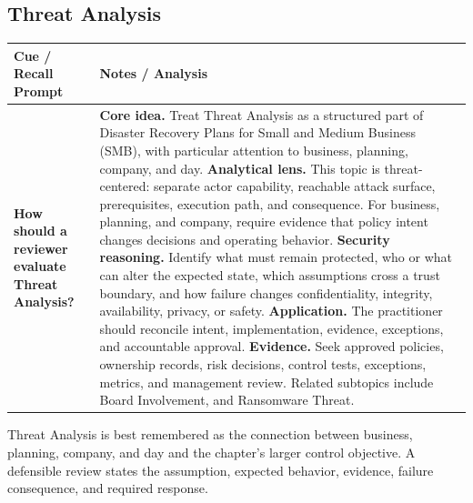 \documentclass[11pt]{article}
\newcommand{\CornellHeader}{%
\rowcolor{Navy}\color{white}\bfseries Cue / Recall Prompt & \color{white}\bfseries Notes / Analysis\\\hline}
\newcommand{\CornellRow}[2]{%
\cellcolor{CueGray}\RaggedRight\textbf{#1} & \RaggedRight #2\\\hline}
\begin{document}
\subsection*{Threat Analysis}
\begin{longtable}{>{\RaggedRight\arraybackslash}p{}|>{\RaggedRight\arraybackslash}p{}}
\CornellHeader
\CornellRow{How should a reviewer evaluate Threat Analysis?}{\textbf{Core idea.} Treat Threat Analysis as a structured part of Disaster Recovery Plans for Small and Medium Business (SMB), with particular attention to business, planning, company, and day. \textbf{Analytical lens.} This topic is threat-centered: separate actor capability, reachable attack surface, prerequisites, execution path, and consequence. For business, planning, and company, require evidence that policy intent changes decisions and operating behavior. \textbf{Security reasoning.} Identify what must remain protected, who or what can alter the expected state, which assumptions cross a trust boundary, and how failure changes confidentiality, integrity, availability, privacy, or safety. \textbf{Application.} The practitioner should reconcile intent, implementation, evidence, exceptions, and accountable approval. \textbf{Evidence.} Seek approved policies, ownership records, risk decisions, control tests, exceptions, metrics, and management review. Related subtopics include Board Involvement, and Ransomware Threat.}
\end{longtable}
\begin{topicsummary}
Threat Analysis is best remembered as the connection between business, planning, company, and day and the chapter's larger control objective. A defensible review states the assumption, expected behavior, evidence, failure consequence, and required response.
\end{topicsummary}
\end{document}

